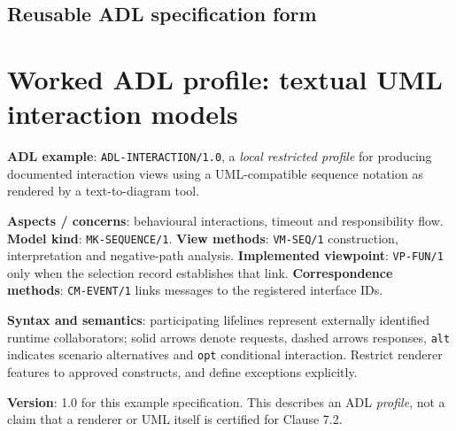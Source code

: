 \documentclass[11pt,letterpaper]{article}
\begin{document}
\subsection{Reusable ADL specification form}
\section{Worked ADL profile: textual UML interaction models}
\begin{Worked}\textbf{ADL example}: \texttt{ADL-INTERACTION/1.0}, a \emph{local restricted profile} for producing documented interaction views using a UML-compatible sequence notation as rendered by a text-to-diagram tool.\par
\textbf{Aspects / concerns}: behavioural interactions, timeout and responsibility flow. \textbf{Model kind}: \texttt{MK-SEQUENCE/1}. \textbf{View methods}: \texttt{VM-SEQ/1} construction, interpretation and negative-path analysis. \textbf{Implemented viewpoint}: \texttt{VP-FUN/1} only when the selection record establishes that link. \textbf{Correspondence methods}: \texttt{CM-EVENT/1} links messages to the registered interface IDs.\par
\textbf{Syntax and semantics}: participating lifelines represent externally identified runtime collaborators; solid arrows denote requests, dashed arrows responses, \texttt{alt} indicates scenario alternatives and \texttt{opt} conditional interaction. Restrict renderer features to approved constructs, and define exceptions explicitly.\par
\textbf{Version}: 1.0 for this example specification. This describes an ADL \emph{profile}, not a claim that a renderer or UML itself is certified for Clause 7.2.
\end{Worked}
\end{document}

